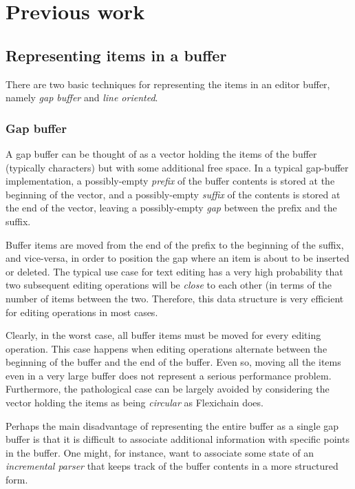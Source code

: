 \section{Previous work}
\label{sec-previous-work}

\subsection{Representing items in a buffer}

There are two basic techniques for representing the items in an editor
buffer, namely \emph{gap buffer} and \emph{line oriented}.

\subsubsection{Gap buffer}
\label{sec-previous-gap-buffer}

A gap buffer can be thought of as a vector holding the items of the
buffer (typically characters) but with some additional free space.  In
a typical gap-buffer implementation, a possibly-empty \emph{prefix} of
the buffer contents is stored at the beginning of the vector, and a
possibly-empty \emph{suffix} of the contents is stored at the end of
the vector, leaving a possibly-empty \emph{gap} between the prefix and
the suffix.

Buffer items are moved from the end of the prefix to the beginning of
the suffix, and vice-versa, in order to position the gap where an item
is about to be inserted or deleted.  The typical use case for text
editing has a very high probability that two subsequent editing
operations will be \emph{close} to each other (in terms of the number
of items between the two.  Therefore, this data structure is very
efficient for editing operations in most cases.

Clearly, in the worst case, all buffer items must be moved for every
editing operation.  This case happens when editing operations
alternate between the beginning of the buffer and the end of the
buffer.  Even so, moving all the items even in a very large buffer
does not represent a serious performance problem.  Furthermore, the
pathological case can be largely avoided by considering the vector
holding the items as being \emph{circular} as Flexichain
\cite{flexichain} does.

Perhaps the main disadvantage of representing the entire buffer as a
single gap buffer is that it is difficult to associate additional
information with specific points in the buffer.  One might, for
instance, want to associate some state of an \emph{incremental parser}
that keeps track of the buffer contents in a more structured form.

